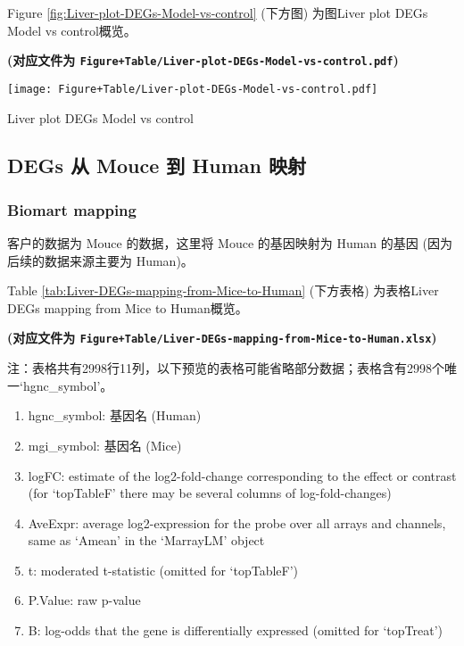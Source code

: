 \documentclass[
]{article}
\providecommand{\tightlist}{%
  \setlength{\itemsep}{0pt}\setlength{\parskip}{0pt}}
\begin{document}
Figure \ref{fig:Liver-plot-DEGs-Model-vs-control} (下方图) 为图Liver plot DEGs Model vs control概览。

\textbf{(对应文件为 \texttt{Figure+Table/Liver-plot-DEGs-Model-vs-control.pdf})}

\def\@captype{figure}
\begin{center}
\texttt{[image: Figure+Table/Liver-plot-DEGs-Model-vs-control.pdf]}
\caption{Liver plot DEGs Model vs control}\label{fig:Liver-plot-DEGs-Model-vs-control}
\end{center}

\hypertarget{degs-ux4ece-mouce-ux5230-human-ux6620ux5c04}{%
\subsection{DEGs 从 Mouce 到 Human 映射}\label{degs-ux4ece-mouce-ux5230-human-ux6620ux5c04}}

\hypertarget{biomart-mapping}{%
\subsubsection{Biomart mapping}\label{biomart-mapping}}

客户的数据为 Mouce 的数据，这里将 Mouce 的基因映射为 Human 的基因 (因为后续的数据来源主要为 Human)。

Table \ref{tab:Liver-DEGs-mapping-from-Mice-to-Human} (下方表格) 为表格Liver DEGs mapping from Mice to Human概览。

\textbf{(对应文件为 \texttt{Figure+Table/Liver-DEGs-mapping-from-Mice-to-Human.xlsx})}

\begin{center}\begin{tcolorbox}[colback=gray!10, colframe=gray!50, width=0.9\linewidth, arc=1mm, boxrule=0.5pt]注：表格共有2998行11列，以下预览的表格可能省略部分数据；表格含有2998个唯一`hgnc\_symbol'。
\end{tcolorbox}
\end{center}
\begin{center}\begin{tcolorbox}[colback=gray!10, colframe=gray!50, width=0.9\linewidth, arc=1mm, boxrule=0.5pt]\begin{enumerate}\tightlist
\item hgnc\_symbol:  基因名 (Human)
\item mgi\_symbol:  基因名 (Mice)
\item logFC:  estimate of the log2-fold-change corresponding to the effect or contrast (for ‘topTableF’ there may be several columns of log-fold-changes)
\item AveExpr:  average log2-expression for the probe over all arrays and channels, same as ‘Amean’ in the ‘MarrayLM’ object
\item t:  moderated t-statistic (omitted for ‘topTableF’)
\item P.Value:  raw p-value
\item B:  log-odds that the gene is differentially expressed (omitted for ‘topTreat’)
\end{enumerate}\end{tcolorbox}
\end{center}
\end{document}
